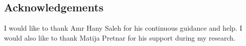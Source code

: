 \documentclass[a0,portrait]{a0poster}
\begin{document}
\begin{multicols}{2}
\nocite{*} %


\section*{Acknowledgements}

I would like to thank Amr Hany Saleh for his continuous guidance and help. I would also like to thank Matija Pretnar for his support during my research.


\end{multicols}
\end{document}
